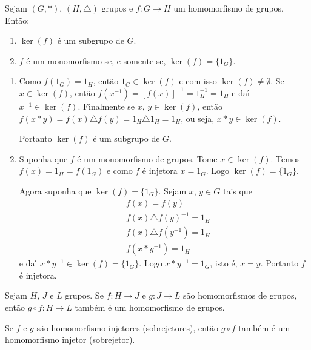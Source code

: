 \begin{proposicao}
	Sejam $(G, *)$, $(H, \triangle)$ grupos e $f : G \to H$ um homomorfismo de grupos. Ent\~ao:
	\begin{enumerate}[label={\roman*})]
		\item $\ker(f)$ \'e um subgrupo de $G$.
		\item $f$ \'e um monomorfismo se, e somente se, $\ker(f) = \{1_G\}$.
	\end{enumerate}
\end{proposicao}
\begin{prova}
	\begin{enumerate}[label={\roman*})]
		\item Como $f(1_G) = 1_H$, ent\~ao $1_G \in \ker(f)$ e com isso $\ker(f) \ne \emptyset$. Se $x \in \ker(f)$, ent\~ao $f(x^{-1}) = [f(x)]^{-1} = 1_H^{-1} = 1_H$ e da{\'\i} $x^{-1} \in \ker(f)$. Finalmente se $x$, $y \in \ker(f)$, ent\~ao $f(x*y) = f(x)\triangle f(y) = 1_H \triangle 1_H = 1_H$, ou seja, $x * y \in \ker(f)$.

		Portanto $\ker(f)$ \'e um subgrupo de $G$.

		\item Suponha que $f$ \'e um monomorfismo de grupos. Tome $x \in \ker(f)$. Temos $f(x) = 1_H = f(1_G)$ e como $f$ \'e injetora $x = 1_G$. Logo $\ker(f) = \{1_G\}$.

		Agora suponha que $\ker(f) = \{1_G\}$. Sejam $x$, $y \in G$ tais que
		\begin{align*}
			&f(x) = f(y)\\
			&f(x)\triangle f(y)^{-1} = 1_H\\
			&f(x)\triangle f(y^{-1}) = 1_H\\
			&f(x * y^{-1}) = 1_H
		\end{align*}
		e da{\'\i} $x*y^{-1} \in \ker(f) = \{1_G\}$. Logo $x*y^{-1} = 1_G$, isto \'e, $x = y$. Portanto $f$ \'e injetora.
	\end{enumerate}
\end{prova}

        \begin{proposicao}
            Sejam $H$, $J$ e $L$ grupos. Se $f : H \to J$ e $g : J \to L$ são homomorfismos de grupos, então $g \circ f : H \to L$ também é um homomorfismo de grupos.
        \end{proposicao}

   
        \begin{corolario}
            Se $f$ e $g$ são homomorfismo injetores (sobrejetores), então $g \circ f$ também é um homomorfismo injetor (sobrejetor).
        \end{corolario}

